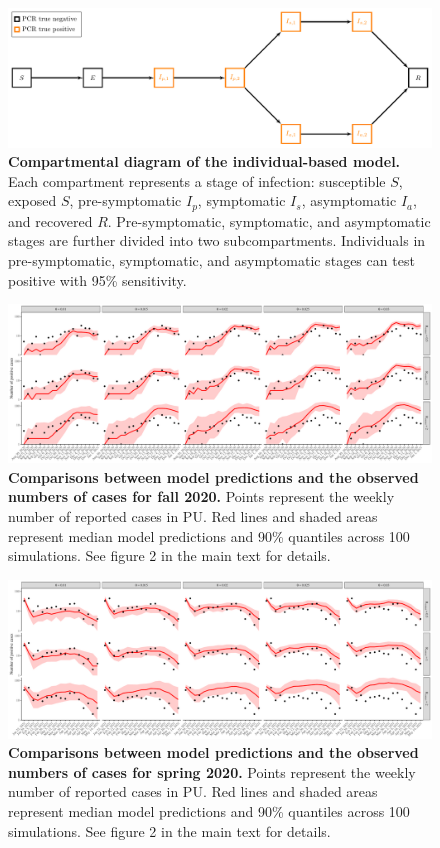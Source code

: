 \documentclass[12pt]{article}
\begin{document}
\begin{figure}[!htp]
\includegraphics[width=\textwidth]{../figure_diagram/diagram.pdf}
\caption{
\textbf{Compartmental diagram of the individual-based model.}
Each compartment represents a stage of infection: susceptible $S$, exposed $S$, pre-symptomatic $I_p$, symptomatic $I_s$, asymptomatic $I_a$, and recovered $R$.
Pre-symptomatic, symptomatic, and asymptomatic stages are further divided into two subcompartments.
Individuals in pre-symptomatic, symptomatic, and asymptomatic stages can test positive with 95\% sensitivity.
}
\end{figure}

\pagebreak

\begin{figure}[!htp]
\includegraphics[width=\textwidth]{../figure_princeton_new/figure_princeton_simulation_fall_2020_all.pdf}
\caption{
\textbf{Comparisons between model predictions and the observed numbers of cases for fall 2020.}
Points represent the weekly number of reported cases in PU.
Red lines and shaded areas represent median model predictions and 90\% quantiles across 100 simulations.
See figure 2 in the main text for details.
}
\end{figure}

\pagebreak

\begin{figure}[!htp]
\includegraphics[width=\textwidth]{../figure_princeton_new/figure_princeton_simulation_spring_2020_all.pdf}
\caption{
\textbf{Comparisons between model predictions and the observed numbers of cases for spring 2020.}
Points represent the weekly number of reported cases in PU.
Red lines and shaded areas represent median model predictions and 90\% quantiles across 100 simulations.
See figure 2 in the main text for details.
}
\end{figure}
\end{document}
